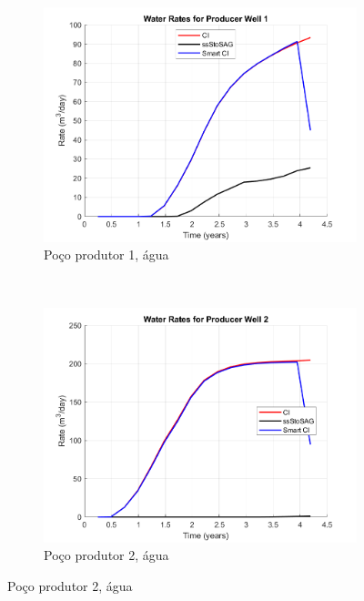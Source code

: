 \begin{figure}[!ht]
	\centering
	\begin{subfigure}[b]{.3\textwidth}
		\includegraphics[width=\textwidth]{figs/resultadosEgg/imgsim2/EGG_WaterWell1_Zoom}
		\caption{Po\c{c}o produtor 1, \'{a}gua}
		\label{EGG2_WaterWell1}
	\end{subfigure}
	~
	\begin{subfigure}[b]{.3\textwidth}
		\includegraphics[width=\textwidth]{figs/resultadosEgg/imgsim2/EGG_WaterWell2_Zoom}
		\caption{Po\c{c}o produtor 2, \'{a}gua}
		\label{EGG2_WaterWell2}
	\end{subfigure}
	

\end{figure}
